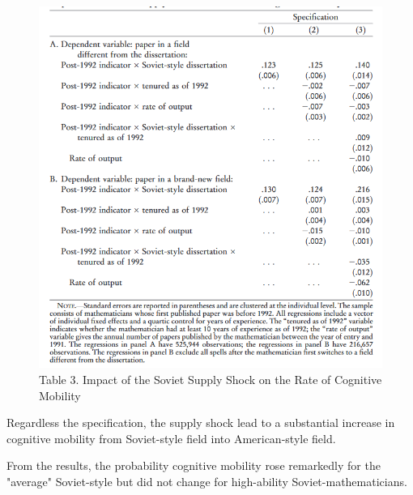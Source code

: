 \documentclass[../root]{subfiles}
\begin{document}
    \begin{figure}
        \centering
        \includegraphics[width = \linewidth]{_images/0918sugiyama/Table_3.png}
        \caption{Table 3. Impact of the Soviet Supply Shock on the Rate of Cognitive Mobility}
        \label{fig:my_label}
    \end{figure}
    
    Regardless the specification, the supply shock lead to a substantial increase in cognitive mobility from Soviet-style field into American-style field.
    
    From the results, the probability cognitive mobility rose remarkedly for the "average" Soviet-style but did not change for high-ability Soviet-mathematicians.
    
\end{document}
